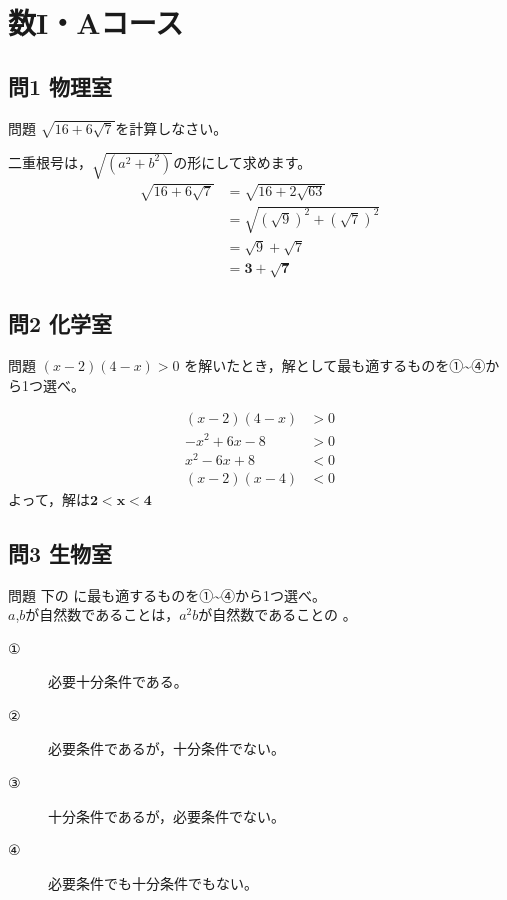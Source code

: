 \documentclass[a5paper]{ltjsarticle}
\begin{document}
\section{数I・Aコース}
\subsection*{問1 物理室}
\begin{itembox}[l]{問題}
  $\sqrt{16+6\sqrt{7}}$を計算しなさい。
\end{itembox}

二重根号は，$\sqrt{(a^2+b^2)}$の形にして求めます。
\begin{align*}
  \sqrt{16+6\sqrt{7}}&=\sqrt{16+2\sqrt{63}}\\
  &=\sqrt{{\left(\sqrt{9}\right)}^2+{\left(\sqrt{7}\right)}^2}\\
  &=\sqrt{9}+\sqrt{7}\\
  &=\bm{3+\sqrt{7}}
\end{align*}


\subsection*{問2 化学室}
\begin{itembox}[l]{問題}
  $ (x-2)(4-x)>0$ を解いたとき，解として最も適するものを①\textasciitilde ④から1つ選べ。%
\end{itembox}

\begin{align*}
  (x-2)(4-x)&>0\\
-x^2+6x-8&>0\\
x^2-6x+8&<0\\
(x-2)(x-4)&<0
\end{align*}
よって，解は$\bm{2<x<4}$


\subsection*{問3 生物室}
\begin{itembox}[l]{問題}
  下の \fbox{　　} に最も適するものを①\textasciitilde ④から1つ選べ。\\%
  $a$,$b$が自然数であることは，$a^2b$が自然数であることの \fbox{　　} 。
  \begin{description}
    \item[①] 必要十分条件である。
    \item[②] 必要条件であるが，十分条件でない。
    \item[③] 十分条件であるが，必要条件でない。
    \item[④] 必要条件でも十分条件でもない。
  \end{description}
\end{itembox}
\end{document}
